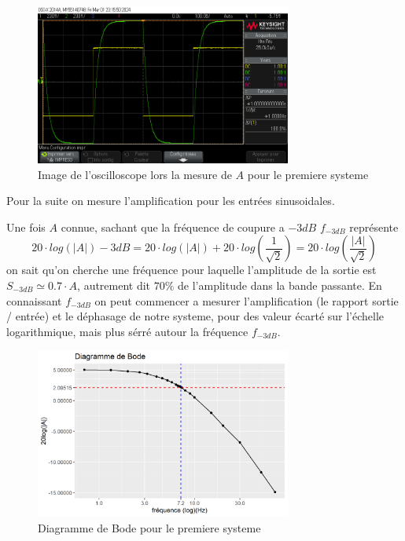 \documentclass[12pt, a4paper]{report}
\begin{document}
\begin{figure}[h]
    \centering
    \includegraphics[width=0.75\textwidth]{mesureA1.png}
    \caption{Image de l'oscilloscope lors la mesure de $A$ pour le premiere systeme}
    \label{fig:mesureA1}
\end{figure}

Pour la suite on mesure l'amplification pour les entrées sinusoidales.

Une fois $A$ connue, sachant que la fréquence de 
coupure a $-3 dB$ $f_{-3dB}$ représente
\[
    20 \cdot log(\left | A \right|) - 3dB =  20 \cdot log\left(\left | A \right|\right) + 20 \cdot log \left( \frac{1}{\sqrt{2}} \right)
    = 20 \cdot log \left( \frac{\left| A \right|}{\sqrt{2}} \right)
\]
on sait qu'on cherche une fréquence pour laquelle l'amplitude de la sortie est $S_{-3dB} \simeq  0.7 \cdot A$, autrement dit $70\%$ de l'amplitude 
dans la bande passante. En connaissant $f_{-3dB}$ on peut commencer a mesurer l'amplification (le rapport sortie / entrée) et le 
déphasage de notre systeme, pour des valeur écarté sur l'échelle logarithmique, mais plus sérré
autour la fréquence $f_{-3dB}$. \par

\begin{figure}[h]
    \centering
    \includegraphics[width=0.75\textwidth]{bode1.png}
    \caption{Diagramme de Bode pour le premiere systeme}
    \label{fig:diagBode1}
\end{figure}
\end{document}

